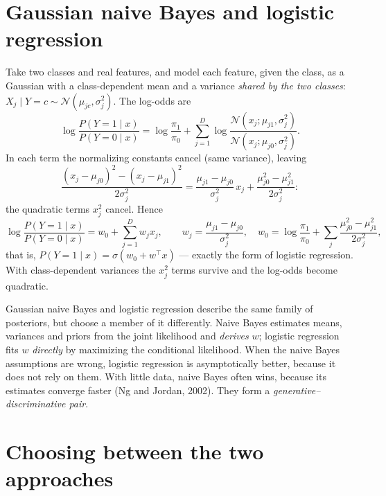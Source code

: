 \begin{notechapter}
\section{Gaussian naive Bayes and logistic regression}\label{generative-discriminative:sec:gnb-lr}

Take two classes and real features, and model each feature, given the class,
as a Gaussian with a class-dependent mean and a variance \emph{shared by the
two classes}:
$X_j\mid Y = c\sim\mathcal N(\mu_{jc},\sigma_j^2)$. The log-odds are
\[
  \log\frac{P(Y=1\mid x)}{P(Y=0\mid x)}
  = \log\frac{\pi_1}{\pi_0} + \sum_{j=1}^D\log\frac{\mathcal N(x_j;\mu_{j1},\sigma_j^2)}{\mathcal N(x_j;\mu_{j0},\sigma_j^2)} .
\]
In each term the normalizing constants cancel (same variance), leaving
\[
  \frac{(x_j-\mu_{j0})^2 - (x_j-\mu_{j1})^2}{2\sigma_j^2}
  = \frac{\mu_{j1}-\mu_{j0}}{\sigma_j^2}\,x_j + \frac{\mu_{j0}^2-\mu_{j1}^2}{2\sigma_j^2}:
\]
the quadratic terms $x_j^2$ cancel. Hence
\[
  \log\frac{P(Y=1\mid x)}{P(Y=0\mid x)} = w_0 + \sum_{j=1}^Dw_jx_j,
  \qquad w_j = \frac{\mu_{j1}-\mu_{j0}}{\sigma_j^2},\quad
  w_0 = \log\frac{\pi_1}{\pi_0} + \sum_j\frac{\mu_{j0}^2-\mu_{j1}^2}{2\sigma_j^2},
\]
that is, $P(Y=1\mid x) = \sigma(w_0 + w^\top x)$ --- exactly the form of logistic
regression. With class-dependent variances the $x_j^2$ terms survive and the
log-odds become quadratic.

\begin{keyidea}
Gaussian naive Bayes and logistic regression describe the same family of
posteriors, but choose a member of it differently. Naive Bayes estimates means,
variances and priors from the joint likelihood and \emph{derives} $w$;
logistic regression fits $w$ \emph{directly} by maximizing the conditional
likelihood. When the naive Bayes assumptions are wrong, logistic regression
is asymptotically better, because it does not rely on them. With little data,
naive Bayes often wins, because its estimates converge faster (Ng and Jordan,
2002). They form a \emph{generative--discriminative pair}.
\end{keyidea}

\section{Choosing between the two approaches}\label{generative-discriminative:sec:choosing}


\end{notechapter}

